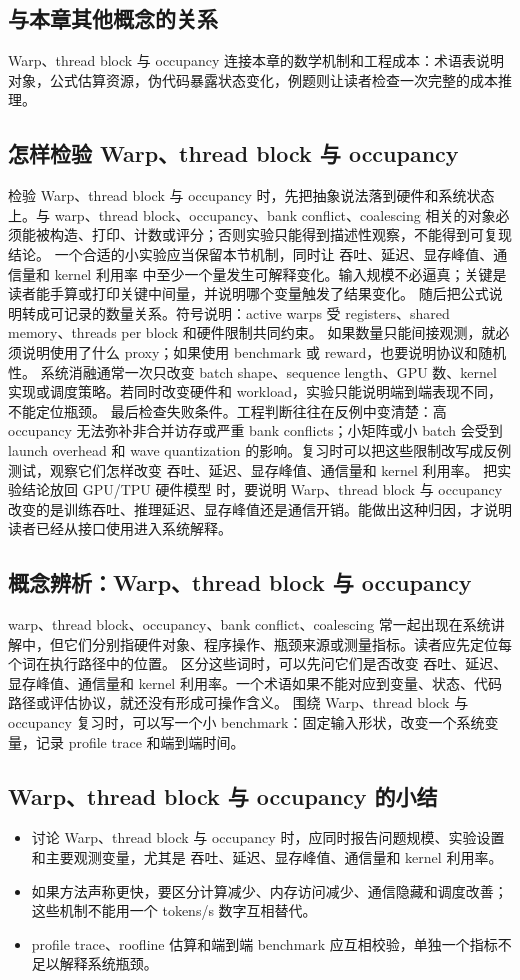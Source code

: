 \documentclass[a4paper]{article}
\begin{document}
\subsection{与本章其他概念的关系}
Warp、thread block 与 occupancy 连接本章的数学机制和工程成本：术语表说明对象，公式估算资源，伪代码暴露状态变化，例题则让读者检查一次完整的成本推理。
\subsection{怎样检验 Warp、thread block 与 occupancy}
检验 Warp、thread block 与 occupancy 时，先把抽象说法落到硬件和系统状态上。与 warp、thread block、occupancy、bank conflict、coalescing 相关的对象必须能被构造、打印、计数或评分；否则实验只能得到描述性观察，不能得到可复现结论。
一个合适的小实验应当保留本节机制，同时让 吞吐、延迟、显存峰值、通信量和 kernel 利用率 中至少一个量发生可解释变化。输入规模不必逼真；关键是读者能手算或打印关键中间量，并说明哪个变量触发了结果变化。
随后把公式说明转成可记录的数量关系。符号说明：active warps 受 registers、shared memory、threads per block 和硬件限制共同约束。 如果数量只能间接观测，就必须说明使用了什么 proxy；如果使用 benchmark 或 reward，也要说明协议和随机性。
系统消融通常一次只改变 batch shape、sequence length、GPU 数、kernel 实现或调度策略。若同时改变硬件和 workload，实验只能说明端到端表现不同，不能定位瓶颈。
最后检查失败条件。工程判断往往在反例中变清楚：高 occupancy 无法弥补非合并访存或严重 bank conflicts；小矩阵或小 batch 会受到 launch overhead 和 wave quantization 的影响。复习时可以把这些限制改写成反例测试，观察它们怎样改变 吞吐、延迟、显存峰值、通信量和 kernel 利用率。
把实验结论放回 GPU/TPU 硬件模型 时，要说明 Warp、thread block 与 occupancy 改变的是训练吞吐、推理延迟、显存峰值还是通信开销。能做出这种归因，才说明读者已经从接口使用进入系统解释。
\subsection{概念辨析：Warp、thread block 与 occupancy}
warp、thread block、occupancy、bank conflict、coalescing 常一起出现在系统讲解中，但它们分别指硬件对象、程序操作、瓶颈来源或测量指标。读者应先定位每个词在执行路径中的位置。
区分这些词时，可以先问它们是否改变 吞吐、延迟、显存峰值、通信量和 kernel 利用率。一个术语如果不能对应到变量、状态、代码路径或评估协议，就还没有形成可操作含义。
围绕 Warp、thread block 与 occupancy 复习时，可以写一个小 benchmark：固定输入形状，改变一个系统变量，记录 profile trace 和端到端时间。
\subsection{Warp、thread block 与 occupancy 的小结}
\begin{itemize}
\item 讨论 Warp、thread block 与 occupancy 时，应同时报告问题规模、实验设置和主要观测变量，尤其是 吞吐、延迟、显存峰值、通信量和 kernel 利用率。
\item 如果方法声称更快，要区分计算减少、内存访问减少、通信隐藏和调度改善；这些机制不能用一个 tokens/s 数字互相替代。
\item profile trace、roofline 估算和端到端 benchmark 应互相校验，单独一个指标不足以解释系统瓶颈。
\end{itemize}
\end{document}
